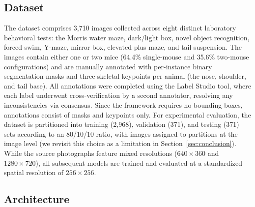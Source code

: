 \documentclass[runningheads]{llncs}
\begin{document}
\subsection{Dataset}
The dataset comprises 3{,}710 images collected across eight distinct
laboratory behavioral tests: the Morris water maze, dark/light box,
novel object recognition, forced swim, Y-maze, mirror box, elevated
plus maze, and tail suspension. The images contain either one or two
mice (64.4\% single-mouse and 35.6\% two-mouse configurations) and
are manually annotated with per-instance binary segmentation masks
and three skeletal keypoints per animal (the nose, shoulder, and tail
base). All annotations were completed using the Label Studio tool,
where each label underwent cross-verification by a second annotator,
resolving any inconsistencies via consensus. Since the framework
requires no bounding boxes, annotations consist of masks and keypoints
only. For experimental evaluation, the dataset is partitioned into
training (2{,}968), validation (371), and testing (371) sets according
to an 80/10/10 ratio, with images assigned to partitions at the image
level (we revisit this choice as a limitation in
Section~\ref{sec:conclusion}). While the source photographs feature mixed
resolutions ($640\times360$ and $1280\times720$), all subsequent
models are trained and evaluated at a standardized spatial resolution
of $256\times256$.

\subsection{Architecture}
\end{document}
